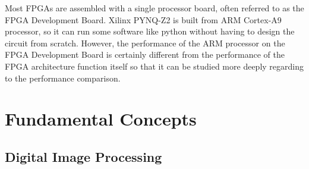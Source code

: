 Most FPGAs are assembled with a single processor board, often referred to as the FPGA Development Board. Xilinx PYNQ-Z2 is built from ARM Cortex-A9 processor, so it can run some software like python without having to design the circuit from scratch. However, the performance of the ARM processor on the FPGA Development Board is certainly different from the performance of the FPGA architecture function itself so that it can be studied more deeply regarding to the performance comparison.


\section{Fundamental Concepts}


\subsection{Digital Image Processing}

